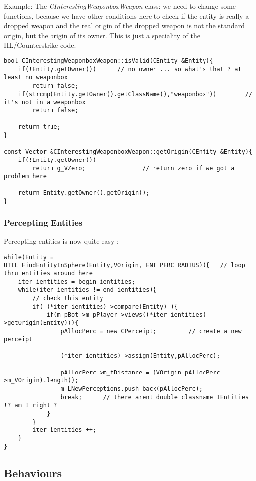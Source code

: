 \documentclass[12pt]{article}
\begin{document}
Example: The \textit{CInterestingWeaponboxWeapon} class: we need to change some functions, because we have other conditions here to check if the entity is really a dropped weapon and the real origin of the dropped weapon is not the standard origin, but the origin of its owner. This is just a speciality of the HL/Counterstrike code.

\linespread{1.0}
\scriptsize
\begin{verbatim}
bool CInterestingWeaponboxWeapon::isValid(CEntity &Entity){
    if(!Entity.getOwner())		// no owner ... so what's that ? at least no weaponbox
        return false;
    if(strcmp(Entity.getOwner().getClassName(),"weaponbox"))		// it's not in a weaponbox
        return false;

    return true;
}

const Vector &CInterestingWeaponboxWeapon::getOrigin(CEntity &Entity){
    if(!Entity.getOwner())
        return g_VZero;                // return zero if we got a problem here

    return Entity.getOwner().getOrigin();
}
\end{verbatim}
\linespread{1.3}
\normalsize

\subsubsection{Percepting Entities}

Percepting entities is now quite easy :
\linespread{1.0}
\scriptsize
\begin{verbatim}
while(Entity = UTIL_FindEntityInSphere(Entity,VOrigin,_ENT_PERC_RADIUS)){	// loop thru entities around here
    iter_ientities = begin_ientities;
    while(iter_ientities != end_ientities){
        // check this entity
        if( (*iter_ientities)->compare(Entity) ){
            if(m_pBot->m_pPlayer->views((*iter_ientities)->getOrigin(Entity))){
                pAllocPerc = new CPerceipt;			// create a new perceipt
                
                (*iter_ientities)->assign(Entity,pAllocPerc);
                
                pAllocPerc->m_fDistance = (VOrigin-pAllocPerc->m_VOrigin).length();
                m_LNewPerceptions.push_back(pAllocPerc);
                break;		// there arent double classname IEntities !? am I right ?
            }
        }
        iter_ientities ++;
    }
}
\end{verbatim}
\linespread{1.3}
\normalsize

\subsection{Behaviours}
\end{document}
